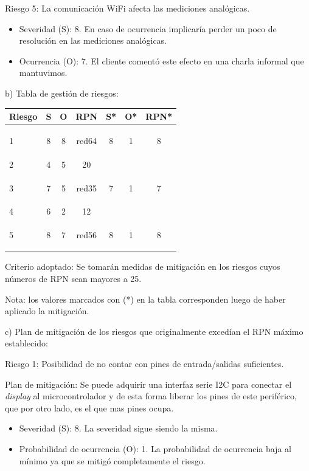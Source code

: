 \documentclass[11pt]{charter}
\begin{document}
Riesgo 5: La comunicación WiFi afecta las mediciones analógicas.
\begin{itemize}
\item Severidad (S): 8. En caso de ocurrencia implicaría perder un poco de resolución en las mediciones analógicas. 
\item Ocurrencia (O): 7. El cliente comentó este efecto en una charla informal que mantuvimos.
\end{itemize}


b) Tabla de gestión de riesgos:

\begin{table}[htpb]
\centering
\begin{tabularx}{\linewidth}{@{}|X|c|c|c|c|c|c|@{}}
\hline
\rowcolor[HTML]{C0C0C0} 
Riesgo & S & O & RPN & S* & O* & RPN* \\ \hline
  1    & 8 & 8 &  \begin{consigna}{red}64\end{consigna} & 8  & 1  &  8   \\ \hline
  2    & 4 & 5 &  20 &    &    &      \\ \hline
  3    & 7 & 5 &  \begin{consigna}{red}35\end{consigna} & 7  & 1  &  7   \\ \hline
  4    & 6 & 2 &  12 &    &    &      \\ \hline
  5    & 8 & 7 &  \begin{consigna}{red}56\end{consigna} & 8  & 1  &  8   \\ \hline
\end{tabularx}%
\end{table}

Criterio adoptado: 
Se tomarán medidas de mitigación en los riesgos cuyos números de RPN sean mayores a 25.

Nota: los valores marcados con (*) en la tabla corresponden luego de haber aplicado la mitigación.

c) Plan de mitigación de los riesgos que originalmente excedían el RPN máximo establecido:
 
Riesgo 1: Posibilidad de no contar con pines de entrada/salidas suficientes.

Plan de mitigación: Se puede adquirir una interfaz serie I2C para conectar el \textit{display} al microcontrolador y de esta forma liberar los pines de este periférico, que por otro lado, es el que mas pines ocupa.
\begin{itemize}
\item Severidad (S): 8. La severidad sigue siendo la misma.
\item Probabilidad de ocurrencia (O): 1. La probabilidad de ocurrencia baja al mínimo ya que se mitigó completamente el riesgo.
\end{itemize}
\end{document}
